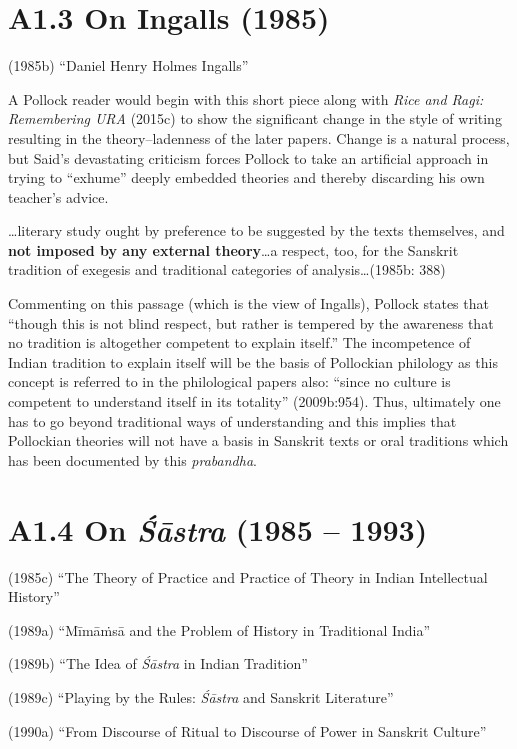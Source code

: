 \section*{A1.3 On Ingalls (1985)}

(1985b) “Daniel Henry Holmes Ingalls”

A Pollock reader would begin with this short piece along with \textit{Rice and Ragi: Remembering URA} (2015c) to show the significant change in the style of writing resulting in the theory–ladenness of the later papers. Change is a natural process, but Said’s devastating criticism forces Pollock to take an artificial approach in trying to “exhume” deeply embedded theories and thereby discarding his own teacher’s advice.

\begin{myquote}
…literary study ought by preference to be suggested by the texts themselves, and \textbf{not imposed by any external theory}…a respect, too, for the Sanskrit tradition of exegesis and traditional categories of analysis…(1985b: 388)
\end{myquote}

Commenting on this passage (which is the view of Ingalls), Pollock states that “though this is not blind respect, but rather is tempered by the awareness that no tradition is altogether competent to explain itself.” The incompetence of Indian tradition to explain itself will be the basis of Pollockian philology as this concept is referred to in the philological papers also: “since no culture is competent to understand itself in its totality” (2009b:954). Thus, ultimately one has to go beyond traditional ways of understanding and this implies that Pollockian theories will not have a basis in Sanskrit texts or oral traditions which has been documented by this \textit{prabandha}.


\section*{A1.4 On \textit{Śāstra} (1985 – 1993)}

(1985c) “The Theory of Practice and Practice of Theory in Indian Intellectual History”

(1989a) “Mīmāṁsā and the Problem of History in Traditional India”

(1989b) “The Idea of \textit{Śāstra} in Indian Tradition”

(1989c) “Playing by the Rules: \textit{Śāstra} and Sanskrit Literature”

(1990a) “From Discourse of Ritual to Discourse of Power in Sanskrit Culture”

